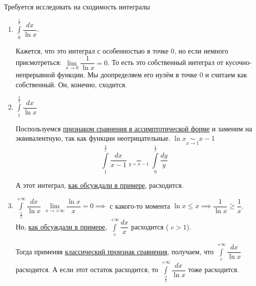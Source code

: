 \documentclass[../main.tex]{subfiles}
\begin{document}
\begin{example}
    
    ~

    Требуется исследовать на сходимость интегралы
    \begin{enumerate}
        \item \( \displaystyle\int\limits_{ 0}^{ \frac{ 1}{ 2} } \dfrac{ dx}{ \ln x} \).
        \par Кажется, что это интеграл с особенностью в точке 0, но если немного присмотреться: \( \lim\limits_{ x \rightarrow 0} \dfrac{ 1}{ \ln x} =0\). То есть это собственный интеграл от кусочно-непрерывной функции. 
        Мы доопределяем его нулём в точке 0 и считаем как собственный. Он, конечно, сходится. 
        \item \( \displaystyle\int\limits_{ 1}^{ \frac{ 3}{ 2} } \dfrac{ dx}{ \ln x} \)
        \par Поспользуемся \hyperlink{thm:converge_sim}{признаком сравнения в ассимптотической форме} и заменим на эквивалентную, так как функции неотрицательные. \( \ln x \underset{x \rightarrow 1}{\sim} x-1\)
        \[ \displaystyle\int\limits_{ 1}^{ \frac{ 3}{ 2} } \dfrac{ dx}{ x-1} \underset{y=x-1}{=} \displaystyle\int\limits_{ 0}^{ \frac{ 1}{ 2} } \dfrac{ dy}{ y}\]
        \par А этот интеграл, \hyperlink{ex:converge}{как обсуждали в примере}, расходится.
        \item \( \displaystyle\int\limits_{ \frac{ 3}{ 2} }^{ + \infty } \dfrac{ dx}{ \ln x} \)
        \( \lim\limits_{ x \rightarrow +\infty} \dfrac{ \ln x}{ x}=0 \implies \) с какого-то момента \( \ln x \leq x \implies \dfrac{ 1}{ \ln x} \geq \dfrac{ 1}{ x} \). Но, \hyperlink{ex:converge}{как обсуждали в примере}, 
        \( \displaystyle\int\limits_{ c}^{ + \infty } \dfrac{ dx}{ x} \) расходится ( \( c>1\)). 

        Тогда применяя \hyperlink{thm:converge_classic}{классический произнак сравнения}, получаем, что \( \displaystyle\int\limits_{ c}^{ + \infty } \dfrac{ dx}{ \ln x} \) расходится. А если этот остаток расходится, то \( \displaystyle\int\limits_{ \frac{ 3}{ 2} }^{ + \infty} \dfrac{ dx}{ \ln x} \) тоже расходится.
    \end{enumerate}
\end{example}
\end{document}
